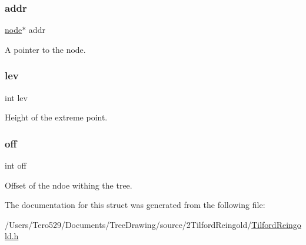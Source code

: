 \subsubsection{\texorpdfstring{addr}{addr}}
{\footnotesize\ttfamily \hyperlink{binary_tree_w_s_8h_aafd781b4673cf2585cd9a156aebd08de}{node}$\ast$ addr}



A pointer to the node. 

\hypertarget{structextremepoints_aea7231f581e9da9990ab7ad6fb9a8ce3}{}\label{structextremepoints_aea7231f581e9da9990ab7ad6fb9a8ce3} 
\subsubsection{\texorpdfstring{lev}{lev}}
{\footnotesize\ttfamily int lev}



Height of the extreme point. 

\hypertarget{structextremepoints_a9e515b0315e6fc452a46dc6496979ee3}{}\label{structextremepoints_a9e515b0315e6fc452a46dc6496979ee3} 
\subsubsection{\texorpdfstring{off}{off}}
{\footnotesize\ttfamily int off}



Offset of the ndoe withing the tree. 



The documentation for this struct was generated from the following file\+:\begin{DoxyCompactItemize}
\item 
/\+Users/\+Tero529/\+Documents/\+Tree\+Drawing/source/2\+Tilford\+Reingold/\hyperlink{_tilford_reingold_8h}{Tilford\+Reingold.\+h}\end{DoxyCompactItemize}

